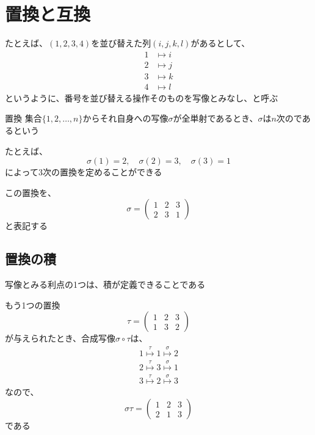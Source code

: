 \documentclass[../../../topic_linear-algebra]{subfiles}
\begin{document}
\sectionline
\section{置換と互換}

たとえば、$(1,2,3,4)$を並び替えた列$(i,j,k,l)$があるとして、
\begin{align*}
  1 & \longmapsto i \\
  2 & \longmapsto j \\
  3 & \longmapsto k \\
  4 & \longmapsto l
\end{align*}
というように、番号を並び替える操作そのものを写像とみなし、と呼ぶ

\begin{definition*}{置換}
  集合$\{ 1,2,\ldots,n \}$からそれ自身への写像$\sigma$が全単射であるとき、$\sigma$は$n$次のであるという
\end{definition*}

たとえば、
\begin{equation*}
  \sigma(1) = 2, \quad \sigma(2) = 3, \quad \sigma(3) = 1
\end{equation*}
によって3次の置換を定めることができる

この置換を、
\begin{equation*}
  \sigma = \begin{pmatrix}
    1 & 2 & 3 \\
    2 & 3 & 1
  \end{pmatrix}
\end{equation*}
と表記する

\subsection{置換の積}

写像とみる利点の1つは、積が定義できることである

\br

もう1つの置換
\begin{equation*}
  \tau = \begin{pmatrix}
    1 & 2 & 3 \\
    1 & 3 & 2
  \end{pmatrix}
\end{equation*}
が与えられたとき、合成写像$\sigma \circ \tau$は、
\begin{gather*}
  1 \overset{\tau}{\longmapsto} 1 \overset{\sigma}{\longmapsto} 2 \\
  2 \overset{\tau}{\longmapsto} 3 \overset{\sigma}{\longmapsto} 1 \\
  3 \overset{\tau}{\longmapsto} 2 \overset{\sigma}{\longmapsto} 3
\end{gather*}
なので、
\begin{equation*}
  \sigma \tau = \begin{pmatrix}
    1 & 2 & 3 \\
    2 & 1 & 3
  \end{pmatrix}
\end{equation*}
である
\end{document}
